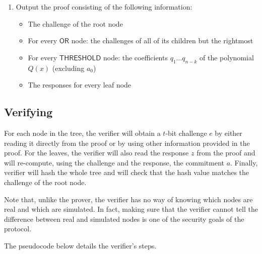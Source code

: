 \documentclass[11pt]{article}
\newcommand{\ornode}{\ensuremath{\mathsf{OR}}}
\newcommand{\tnode}{\ensuremath{\mathsf{THRESHOLD}}}
\begin{document}
\begin{enumerate}
\begin{itemize}
    \end{itemize}
    
    \item Output the proof consisting of the following information:
    \begin{itemize}
        \item The challenge of the root node
        \item For every $\ornode$ node: the challenges of all of its children but the rightmost
        \item For every $\tnode$ node: the coefficients $q_1 \dots q_{n-k}$ of the polynomial $Q(x)$ (excluding $a_0$)
        \item The responses for every leaf node
    \end{itemize}
\end{enumerate}

\subsection{Verifying}
\label{sec:verifying}


For each node in the tree, the verifier will obtain a $t$-bit challenge $e$ by either reading it directly from the proof or by using other information provided in the proof. For the leaves, the verifier will also read the response $z$ from the proof and will re-compute, using the challenge and the response, the commitment $a$.  Finally, verifier will hash the whole tree and will check that the hash value matches the challenge of the root node.

Note that, unlike the prover, the verifier has no way of knowing which nodes are real and which are simulated. In fact, making sure that the verifier cannot tell the difference between real and simulated nodes is one of the security goals of the protocol.

The pseudocode below details the verifier's steps.
\end{document}
